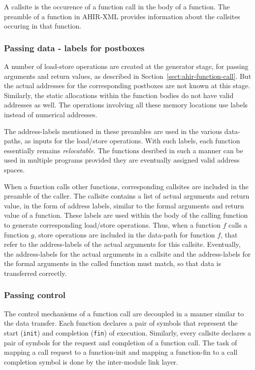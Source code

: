\documentclass[12pt]{article}
\begin{document}
A callsite is the occurence of a function call in the body of a
function. The preamble of a function in AHIR-XML provides information
about the callsites occuring in that function.

\subsubsection{Passing data - labels for postboxes}

A number of load-store operations are created at the generator stage,
for passing arguments and return values, as described in
Section~\ref{sect:ahir-function-call}. But the actual addresses for the
corresponding postboxes are not known at this stage. Similarly, the
static allocations within the function bodies do not have valid
addresses as well. The operations involving all these memory locations
use labels instead of numerical addresses.

The address-labels mentioned in these preambles are used in the
various data-paths, as inputs for the load/store operations. With such
labels, each function essentially remains {\it relocatable}. The
functions desribed in such a manner can be used in multiple programs
provided they are eventually assigned valid address spaces.

When a function calls other functions, corresponding callsites are
included in the preamble of the caller. The callsite contains a list
of actual arguments and return value, in the form of address labels,
similar to the formal arguments and return value of a function. These
labels are used within the body of the calling function to generate
corresponding load/store operations. Thus, when a function $f$ calls a
function $g$, store operations are included in the data-path for
function $f$, that refer to the address-labels of the actual arguments
for this callsite. Eventually, the address-labels for the actual
arguments in a callsite and the address-labels for the formal
arguments in the called function must match, so that data is
transferred correctly.

\subsubsection{Passing control}

The control mechanisms of a function call are decoupled in a manner
similar to the data transfer. Each function declares a pair of symbols
that represent the start ({\tt init}) and completion ({\tt fin}) of
execution. Similarly, every callsite declares a pair of symbols for
the request and completion of a function call. The task of mapping a
call request to a function-init and mapping a function-fin to a call
completion symbol is done by the inter-module link layer.
\end{document}
